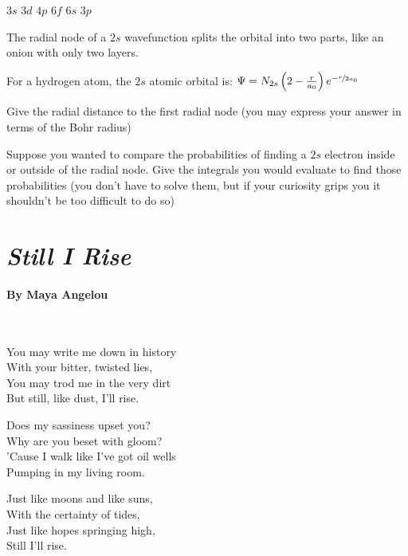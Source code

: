 \documentclass[11pt, letterpaper]{memoir}
\begin{document}
{{\Large $3s$ \hspace{4em} $3d$ \hspace{4em} $4p$ \hspace{4em} $6f$ \hspace{4em} $6s$ \hspace{4em} $3p$}

\vspace{2em}\noindent
The radial node of a $2s$ wavefunction splits the orbital into two parts, like an onion with only two layers.

\noindent
For a hydrogen atom, the $2s$ atomic orbital is: $\Psi = N_{2s}\left(2-\frac{r}{a_0}\right)e^{-\nicefrac{r}{2a_0}}$

\noindent
Give the radial distance to the first radial node (you may express your answer in terms of the Bohr radius)

\vspace{4em}\noindent
Suppose you wanted to compare the probabilities of finding a $2s$ electron inside or outside of the radial node. Give the integrals you would evaluate to find those probabilities (you don't have to solve them, but if your curiosity grips you it shouldn't be too difficult to do so)

\newpage
\pagestyle{empty}
\addtocounter{page}{-1}
\section*{\emph{Still I Rise}}
\paragraph{By Maya Angelou}~

\vspace{1em}
\begin{minipage}[t]{0.49\linewidth}

	You may write me down in history\\
	With your bitter, twisted lies,\\
	You may trod me in the very dirt\\
	But still, like dust, I'll rise.

	Does my sassiness upset you?\\
	Why are you beset with gloom?\\
	’Cause I walk like I've got oil wells\\
	Pumping in my living room.

	Just like moons and like suns,\\
	With the certainty of tides,\\
	Just like hopes springing high,\\
	Still I'll rise.


\end{minipage}}
\end{document}
